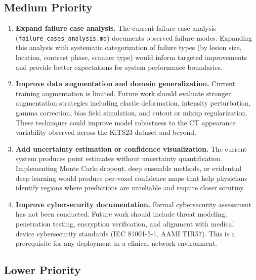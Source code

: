 \subsection{Medium Priority}

\begin{enumerate}
    \item \textbf{Expand failure case analysis.} The current failure case analysis (\texttt{failure\_cases\_analysis.md}) documents observed failure modes. Expanding this analysis with systematic categorization of failure types (by lesion size, location, contrast phase, scanner type) would inform targeted improvements and provide better expectations for system performance boundaries.
    
    \item \textbf{Improve data augmentation and domain generalization.} Current training augmentation is limited. Future work should evaluate stronger augmentation strategies including elastic deformation, intensity perturbation, gamma correction, bias field simulation, and cutout or mixup regularization. These techniques could improve model robustness to the CT appearance variability observed across the KiTS23 dataset and beyond.
    
    \item \textbf{Add uncertainty estimation or confidence visualization.} The current system produces point estimates without uncertainty quantification. Implementing Monte Carlo dropout, deep ensemble methods, or evidential deep learning would produce per-voxel confidence maps that help physicians identify regions where predictions are unreliable and require closer scrutiny.
    
    \item \textbf{Improve cybersecurity documentation.} Formal cybersecurity assessment has not been conducted. Future work should include threat modeling, penetration testing, encryption verification, and alignment with medical device cybersecurity standards (IEC 81001-5-1, AAMI TIR57). This is a prerequisite for any deployment in a clinical network environment.
\end{enumerate}

\subsection{Lower Priority}

